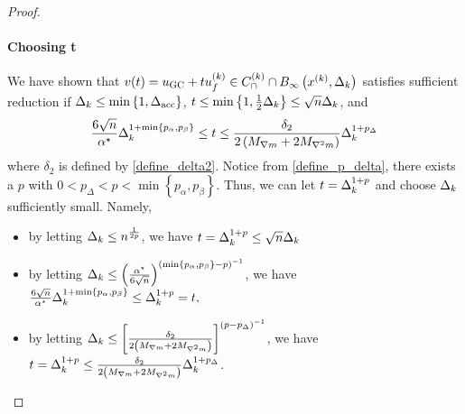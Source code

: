 \begin{proof}
\paragraph*{Choosing t}

We have shown that $v(t) = u_{\textrm{GC}} + t {u^{(k)}_f} \in {C^{(k)}_{\cap}} \cap { B_{\infty}\left(x^{(k)}, \Delta_k\right) }$ satisfies sufficient reduction 
if $\Delta_k \le \min\left\{1, {\Delta_{\textrm{acc}}}\right\}$, $t \le \min\left\{1, \frac 1 2 \Delta_k\right\} \le \sqrt{n} \Delta_k$, and
\begin{align*}
\frac{6 \sqrt{n}}{{ \alpha^{\star} }} \Delta_k^{1 + \min\left\{p_{\alpha}, p_{\beta}\right\}} \le t 
\le \frac {\delta_2}{2\left({M_{\nabla m}} + 2{M_{\nabla^2 m}}\right)} \Delta_k^{1 + p_{\Delta}}
\end{align*}
where $\delta_2$ is defined by \cref{define_delta2}.
Notice from \cref{define_p_delta}, there exists a $p$ with $0 < p_{\Delta} < p < \min\left\{p_{\alpha}, p_{\beta}\right\}$.
Thus, we can let $t = \Delta_k^{1+p}$ and choose $\Delta_k$ sufficiently small.
Namely,
\begin{itemize}
\item by letting 
$\Delta_k \le n^{\frac 1 {2p} }$, we have
$t = \Delta_k^{1+p} \le \sqrt{n} \Delta_k$
\item by letting 
$\Delta_k \le \left(\frac{{ \alpha^{\star} }}{6 \sqrt{n}}\right)^{\left(\min\left\{p_{\alpha}, p_{\beta}\right\} - p\right)^{-1}}$, we have
$\frac{6 \sqrt{n}}{{ \alpha^{\star} }} \Delta_k^{1 + \min\left\{p_{\alpha}, p_{\beta}\right\}} \le \Delta_k^{1+p} = t,$
\item by letting 
$\Delta_k \le \left[ \frac {\delta_2}{2\left({M_{\nabla m}} + 2{M_{\nabla^2 m}}\right)} \right]^{\left(p - p_{\Delta}\right)^{-1}}$, we have
$t = \Delta_k^{1+p} \le  \frac {\delta_2}{2\left({M_{\nabla m}} + 2{M_{\nabla^2 m}}\right)} \Delta_k^{1 + p_{\Delta}}$.
\end{itemize}





\end{proof}
